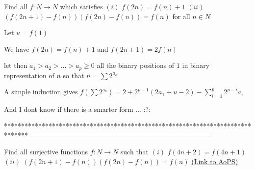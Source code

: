 \begin{solution}
	\begin{tcolorbox}Find all $f:N \to N$ which satisfies
$(i)$ $f(2n)=f(n)+1$
$(ii)$ $(f(2n+1)-f(n))(f(2n)-f(n))=f(n)$
for all $n\in N$\end{tcolorbox}
Let $u=f(1)$

We have $f(2n)=f(n)+1$ and $f(2n+1)=2f(n)$

let then $a_1>a_2>...>a_p\ge 0$ all the binary positions of $1$ in binary representation of $n$ so that $n=\sum 2^{a_k}$

A simple induction gives $\boxed{f(\sum 2^{a_k})=2+2^{p-1}(2a_1+u-2)-\sum_{i=1}^{p} 2^{p-i}a_i}$

And I dont know if there is a smarter form ... :?:
\end{solution}
*******************************************************************************
-------------------------------------------------------------------------------

\begin{problem}
	Find all surjective  functions $f: N \to N$ such that
$(i)$ $f(4n+2)=f(4n+1)$
$(ii)$ $(f(2n+1)-f(n))(f(2n)-f(n))=f(n)$
	\flushright \href{https://artofproblemsolving.com/community/c6h534518}{(Link to AoPS)}
\end{problem}



